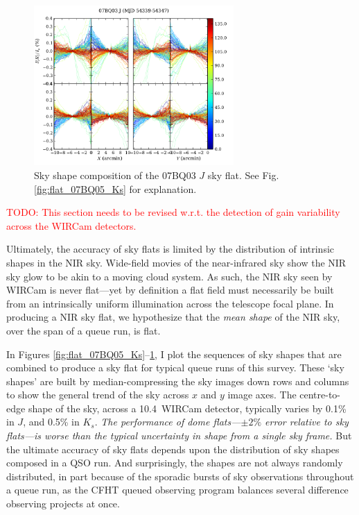 \documentclass[iop]{emulateapj}
\newcommand{\changeit}[1]{\textcolor{red}{#1}} %
\begin{document}
\begin{figure}[t]
   \centering
       \includegraphics[width=3in]{figs/07BQ03_J.pdf}
   \caption[Sky shape composition of the 07BQ03 $J$ sky flat]{Sky shape composition of the 07BQ03 $J$ sky flat. See Fig. \ref{fig:flat_07BQ05_Ks} for explanation.}
   \label{fig:flat_07BQ03_J}
\end{figure}

\changeit{TODO: This section needs to be revised w.r.t. the detection of gain variability across the WIRCam detectors.}

Ultimately, the accuracy of sky flats is limited by the distribution of intrinsic shapes in the NIR sky. Wide-field movies of the near-infrared sky \citep{Adams:1996} show the NIR sky glow to be akin to a moving cloud system. As such, the NIR sky seen by WIRCam is never flat---yet by definition a flat field must necessarily be built from an intrinsically uniform illumination across the telescope focal plane. In producing a NIR sky flat, we hypothesize that the \emph{mean shape} of the NIR sky, over the span of a queue run, is flat.

In Figures \ref{fig:flat_07BQ05_Ks}--\ref{fig:flat_07BQ03_J}, I plot the sequences of sky shapes that are combined to produce a sky flat for typical queue runs of this survey. These `sky shapes' are built by median-compressing the sky images down rows and columns to show the general trend of the sky across $x$ and $y$ image axes. The centre-to-edge shape of the sky, across a 10.4\arcmin\ WIRCam detector, typically varies by 0.1\% in $J$, and 0.5\% in $K_s$. \emph{The performance of dome flats---$\pm2\%$ error relative to sky flats---is worse than the typical uncertainty in shape from a single sky frame.} But the ultimate accuracy of sky flats depends upon the distribution of sky shapes composed in a QSO run. And surprisingly, the shapes are not always randomly distributed, in part because of the sporadic bursts of sky observations throughout a queue run, as the CFHT queued observing program balances several difference observing projects at once.
\end{document}
